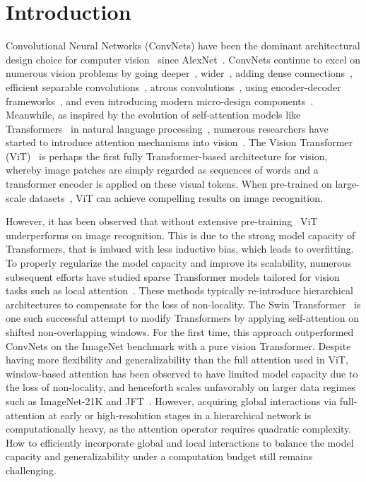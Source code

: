 \documentclass[runningheads]{llncs}
\begin{document}
\section{Introduction}
Convolutional Neural Networks (ConvNets) have been the dominant architectural design choice for computer vision~\cite{krizhevsky2012imagenet,he2016deep,szegedy2015going,szegedy2016rethinking} since AlexNet~\cite{krizhevsky2012imagenet}.
ConvNets continue to excel on numerous vision problems by going deeper~\cite{szegedy2015going}, wider~\cite{szegedy2016rethinking,szegedy2017inception}, adding dense connections~\cite{huang2017densely}, efficient separable convolutions~\cite{howard2017mobilenets,sandler2018mobilenetv2}, atrous convolutions~\cite{chen2017deeplab}, using encoder-decoder frameworks~\cite{ronneberger2015u}, and even introducing modern micro-design components~\cite{liu2022convnet}.
Meanwhile, as inspired by the evolution of self-attention models like Transformers~\cite{vaswani2017attention} in natural language processing~\cite{devlin2018bert,yang2019xlnet,lan2019albert,raffel2019exploring}, numerous researchers have started to introduce attention mechanisms into vision~\cite{wang2018non,carion2020end}. 
The Vision Transformer (ViT)~\cite{dosovitskiy2020image} is perhaps the first fully Transformer-based architecture for vision, whereby image patches are simply regarded as sequences of words and a transformer encoder is applied on these visual tokens. When pre-trained on large-scale datasets~\cite{sun2017revisiting}, ViT can achieve compelling results on image recognition.


However, it has been observed that without extensive pre-training~\cite{dosovitskiy2020image,touvron2021training} ViT underperforms on image recognition. This is due to the strong model capacity of Transformers, that is imbued with less inductive bias, which leads to overfitting.
To properly regularize the model capacity and improve its scalability, numerous subsequent efforts have studied sparse Transformer models tailored for vision tasks such as local attention~\cite{liu2021swin,yang2021focal,li2021localvit,chu2021twins}. These methods typically re-introduce hierarchical architectures to compensate for the loss of non-locality.
The Swin Transformer~\cite{liu2021swin} is one such successful attempt to modify Transformers by applying self-attention on shifted non-overlapping windows. For the first time, this approach outperformed ConvNets on the ImageNet benchmark with a pure vision Transformer.
Despite having more flexibility and generalizability than the full attention used in ViT, window-based attention has been observed to have limited model capacity due to the loss of non-locality, and henceforth scales unfavorably on larger data regimes such as ImageNet-21K and JFT~\cite{dai2021coatnet}.
However, acquiring global interactions via full-attention at early or high-resolution stages in a hierarchical network is computationally heavy, as the attention operator requires quadratic complexity.
How to efficiently incorporate global and local interactions to balance the model capacity and generalizability under a computation budget still remains challenging.
\end{document}
